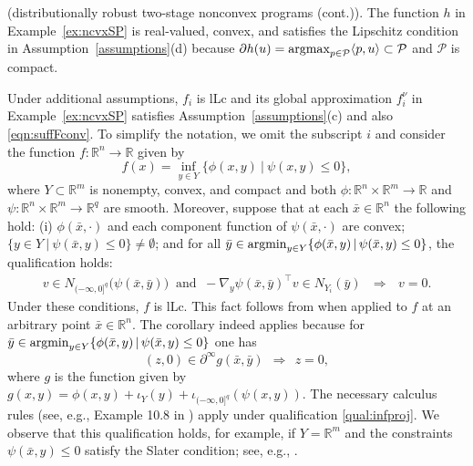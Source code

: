 \documentclass[smallextended,envcountsect]{svjour3}
\renewcommand{\Re}{\mathbb{R}}
\newcommand{\reals}{\mathbb{R}}
\newcommand{\nargmax}{\mathop{\rm argmax}\nolimits}
\newcommand{\nargmin}{\mathop{\rm argmin}\nolimits}
\begin{document}
\begin{example}{\rm (distributionally robust two-stage nonconvex programs (cont.)).}\label{ex:ncvxSP2} The function $h$ in Example~\ref{ex:ncvxSP} is real-valued, convex, and satisfies the Lipschitz condition in Assumption~\ref{assumptions}(d) because $\partial h(u) = \nargmax_{p\in \mathcal{P}} \langle p,u\rangle\subset \mathcal{P}$ and $\mathcal{P}$ is compact. 

Under additional assumptions, $f_i$ is lLc and its global approximation $f_i^\nu$ in  Example~\ref{ex:ncvxSP} satisfies Assumption~\ref{assumptions}(c) and also \eqref{eqn:suffFconv}. To simplify the notation, we omit the subscript $i$ and consider the function $f:\reals^n\to \reals$ given by 
\[
f(x) = \inf_{y \in Y}\big\{ \phi(x,y)~\big|~ \psi(x,y)\leq 0 \big\}, 
\]
where $Y \subset \Re^{m}$ is nonempty, convex, and compact and both $\phi:\Re^n\times \Re^m \to \Re$ and $\psi:\Re^n\times \Re^m \to \Re^{q}$ are smooth. Moreover, suppose that at each $\bar x\in \reals^n$ the following hold: (i) $\phi(\bar x,\cdot)$ and each component function of $\psi(\bar x,\cdot)$ are convex; $\{y\in Y~|~\psi(\bar x,y)\leq 0\}\neq\emptyset$; and for all $\bar y \in \nargmin_{y\in Y}\{\phi(\bar x,y)\,|\, \psi(\bar x,y)\leq 0 \}$, the qualification holds: 
\begin{align}\label{qual:infproj}
v\in N_{(-\infty,0]^q}\big(\psi(\bar x, \bar y)\big) ~\mbox{ and }~ -\nabla_y \psi(\bar x, \bar y)^\top v \in N_{Y_i}(\bar y)~~~\Longrightarrow~~~v = 0.
\end{align}
Under these conditions, $f$ is lLc. This fact follows from \cite[Corollary 10.14(a)]{Rockafellar_Wets_1998} when applied to $f$ at an arbitrary point $\bar x\in\reals^n$. The corollary indeed applies because for $\bar y \in \nargmin_{y\in Y}\{\phi(\bar x,y)\,|\, \psi(\bar x,y)\leq 0 \}$ one has
\[
(z,0) \in \partial^\infty g(\bar x, \bar y)  ~~\Longrightarrow~~ z = 0, 
\]
where $g$ is the function given by $g(x,y) = \phi(x,y) + \iota_Y(y) + \iota_{(-\infty,0]^q}(\psi(x,y))$. The necessary calculus rules (see, e.g., Example 10.8 in \cite{Rockafellar_Wets_1998}) apply under qualification \eqref{qual:infproj}. We observe that this qualification holds, for example, if $Y= \reals^m$ and the constraints $\psi(\bar x, y)\leq 0$ satisfy the Slater condition; see, e.g., \cite[Example 5.47]{Royset_Wets_2021}.  


\end{example}
\end{document}
